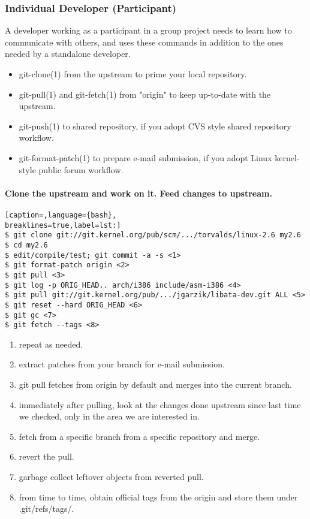 \subsubsection{Individual Developer (Participant)}
A developer working as a participant in a group project needs to learn how to
communicate with others, and uses these commands in addition to the ones needed
by a standalone developer.

\begin{itemize}
\setlength{\itemsep}{0cm}
\setlength{\parskip}{0cm}
\item git-clone(1) from the upstream to prime your local repository.
\item git-pull(1) and git-fetch(1) from "origin" to keep up-to-date with the
upstream.
\item git-push(1) to shared repository, if you adopt CVS style shared
repository workflow.
\item git-format-patch(1) to prepare e-mail submission, if you adopt Linux
kernel-style public forum workflow.
\end{itemize}

\paragraph{Clone the upstream and work on it. Feed changes to upstream.}
\lstset{basicstyle=\scriptsize, numbers=none, captionpos=b, tabsize=4}
\begin{lstlisting}[caption=,language={bash},
breaklines=true,label=lst:]
$ git clone git://git.kernel.org/pub/scm/.../torvalds/linux-2.6 my2.6
$ cd my2.6
$ edit/compile/test; git commit -a -s <1>
$ git format-patch origin <2>
$ git pull <3>
$ git log -p ORIG_HEAD.. arch/i386 include/asm-i386 <4>
$ git pull git://git.kernel.org/pub/.../jgarzik/libata-dev.git ALL <5>
$ git reset --hard ORIG_HEAD <6>
$ git gc <7>
$ git fetch --tags <8>
\end{lstlisting}

\begin{enumerate}
\setlength{\itemsep}{0cm}
\setlength{\parskip}{0cm}
\item repeat as needed.
\item extract patches from your branch for e-mail submission.
\item git pull fetches from origin by default and merges into the current
branch.
\item immediately after pulling, look at the changes done upstream since last
time we checked, only in the area we are interested in.
\item fetch from a specific branch from a specific repository and merge.
\item revert the pull.
\item garbage collect leftover objects from reverted pull.
\item from time to time, obtain official tags from the origin and store them under .git/refs/tags/.
\end{enumerate}

